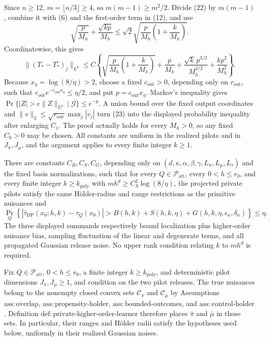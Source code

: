 Since \(n\ge12\), \(m=\lfloor n/3\rfloor\ge4\), so \(m(m-1)\ge m^2/2\).  Divide (22) by \(m(m-1)\), combine it with (6) and the first-order term in (12), and use
\[
 \sqrt{\frac p{M_h}}+\frac{\sqrt{kp}}{M_h}
 \le\sqrt2\sqrt{\frac p{M_h}\left(1+\frac{k}{M_h}\right)}.
\]
Coordinatewise, this gives
\[
 \|(T_*-T_*^\circ)_j\|_{L^p}
 \le C\left\{
 \sqrt{\frac p{M_h}\left(1+\frac{k}{M_h}\right)}
 +\frac p{M_h}
 +\frac{\sqrt{k}\,p^{3/2}}{M_h^{3/2}}
 +\frac{kp^2}{M_h^2}\right\}.
\tag{23}
\]
Because \(x_\eta=\log(8/\eta)>2\), choose a fixed \(c_{\mathrm{out}}>0\), depending only on \(r_{\mathrm{out}}\), such that \(r_{\mathrm{out}}e^{-c_{\mathrm{out}}x_\eta}\le\eta/2\), and put \(p=c_{\mathrm{out}}x_\eta\).  Markov's inequality gives \(\Pr\{|Z|>e\|Z\|_{L^p}\mid\mathcal G\}\le e^{-p}\).  A union bound over the fixed output coordinates and \(\|v\|_2\le\sqrt{r_{\mathrm{out}}}\max_j|v_j|\) turn (23) into the displayed probability inequality after enlarging \(C_1\).  The proof actually holds for every \(M_h>0\), so any fixed \(C_0>0\) may be chosen.  All constants are uniform in the realized pilots and in \(J_\pi,J_\mu\), and the argument applies to every finite integer \(k\ge1\).

There are constants \(C_B,C_S,C_G\), depending only on \((d,\kappa,\alpha,\beta,\gamma,L_\pi,L_\mu,L_\tau)\) and the fixed basis normalizations, such that for every \(Q\in\mathcal P_{\mathrm{att}}\), every \(0<h\le r_0\), and every finite integer \(k\ge k_{\mathrm{poly}}\) with \(m h^d\ge C_S^2\log(8/\eta)\), the projected private pilots satisfy the same H\"older-radius and range restrictions as the primitive nuisances and
\[
 \Pr_Q\!\left\{\left|\widehat\tau_{\mathrm{DP}}(x_0;h,k)-\tau_Q(x_0)\right|>
 B(h,k)+S(h,k,\eta)+G(h,k,\eta,\epsilon_n,\delta_n)\right\}\le\eta.
\]
The three displayed summands respectively bound localization plus higher-order nuisance bias, sampling fluctuation of the linear and degenerate terms, and all propagated Gaussian release noise.  No upper rank condition relating \(k\) to \(m h^d\) is required.

Fix \(Q\in\mathcal P_{\mathrm{att}}\), \(0<h\le r_0\), a finite integer \(k\ge k_{\mathrm{poly}}\), and deterministic pilot dimensions \(J_\pi,J_\mu\ge1\), and condition on the two pilot releases.  The true nuisances belong to the nonempty closed convex sets \(\mathcal C_\pi\) and \(\mathcal C_\mu\) by Assumptions \(\mathrm{ass{:}overlap}\), \(\mathrm{ass{:}propensity\text{-}holder}\), \(\mathrm{ass{:}bounded\text{-}outcomes}\), and \(\mathrm{ass{:}control\text{-}holder}\).  Definition \(\mathrm{def{:}private\text{-}higher\text{-}order\text{-}learner}\) therefore places \(\bar\pi\) and \(\bar\mu\) in those sets.  In particular, their ranges and H\"older radii satisfy the hypotheses used below, uniformly in their realized Gaussian noises.

